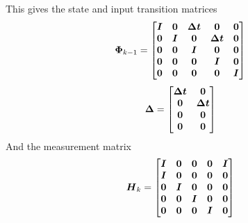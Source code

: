 This gives the state and input transition matrices
\begin{equation*}
    \boldsymbol{\Phi}_{k-1}=
    \begin{bmatrix}
        \boldsymbol{I} & \boldsymbol{0} & \boldsymbol{\Delta t} & \boldsymbol{0} & \boldsymbol{0}\\
        \boldsymbol{0} & \boldsymbol{I} & \boldsymbol{0} & \boldsymbol{\Delta t} & \boldsymbol{0}\\
        \boldsymbol{0} & \boldsymbol{0} & \boldsymbol{I} & \boldsymbol{0} & \boldsymbol{0}\\
        \boldsymbol{0} & \boldsymbol{0} & \boldsymbol{0} & \boldsymbol{I} & \boldsymbol{0}\\
        \boldsymbol{0} & \boldsymbol{0} & \boldsymbol{0} & \boldsymbol{0} & \boldsymbol{I}
    \end{bmatrix}
\end{equation*}
\begin{equation*}
    \boldsymbol{\Delta}=
    \begin{bmatrix}
        \boldsymbol{\Delta t} & \boldsymbol{0}\\
        \boldsymbol{0} & \boldsymbol{\Delta t}\\
        \boldsymbol{0} & \boldsymbol{0}\\
        \boldsymbol{0} & \boldsymbol{0}
    \end{bmatrix}
\end{equation*}
And the measurement matrix
\begin{equation*}
    \boldsymbol{H}_k=
    \begin{bmatrix}
        \boldsymbol{I} & \boldsymbol{0} & \boldsymbol{0} & \boldsymbol{0} & \boldsymbol{I}\\
        \boldsymbol{I} & \boldsymbol{0} & \boldsymbol{0} & \boldsymbol{0} & \boldsymbol{0}\\
        \boldsymbol{0} & \boldsymbol{I} & \boldsymbol{0} & \boldsymbol{0} & \boldsymbol{0}\\
        \boldsymbol{0} & \boldsymbol{0} & \boldsymbol{I} & \boldsymbol{0} & \boldsymbol{0}\\
        \boldsymbol{0} & \boldsymbol{0} & \boldsymbol{0} & \boldsymbol{I} & \boldsymbol{0}
    \end{bmatrix}
\end{equation*}

